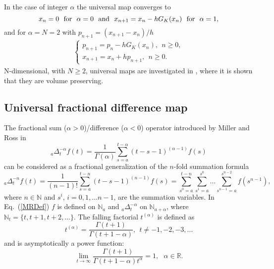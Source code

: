\documentclass[graybox]{svmult}
\begin{document}
In the case of integer $\alpha$ the universal map converges to
\begin{equation}
x_n=0  \  \ {\rm for} \  \ \alpha = 0 \  \ {\rm and} \  \ x_{n+1}=x_n-hG_K(x_n)  
\  \ {\rm for} \  \  \alpha = 1, 
\label{IntFr01} 
\end{equation}
and for $\alpha=N = 2$ with $p_{n+1}=(x_{n+1}-x_n)/h $
\begin{equation}
\begin{array}{c}
\left\{
\begin{array}{lll}
p_{n+1}=p_n-h G_K(x_{n}), \ \ n \ge 0,
\\ 
x_{n+1} = x_{n}+hp_{n+1}, \ \ n \ge 0.
\end{array}
\right.
\end{array} 
\label{IntFr2}
\end{equation} 
N-dimensional, with  $N \ge 2$, universal maps are investigated in \cite{ME4},
where it is shown that they are volume preserving.  


\subsection{Universal fractional difference map}
\label{SecUFDM}


The fractional 
sum ($\alpha>0$)/difference ($\alpha<0$) operator introduced by Miller and Ross in \cite{MR} 
\begin{equation}
_a\Delta^{-\alpha}_{t}f(t)=\frac{1}{\Gamma(\alpha)} \sum^{t-\alpha}_{s=a}(t-s-1)^{(\alpha-1)} f(s)
\label{MRDef}
\end{equation}
can be considered as a fractional generalization of the $n$-fold summation formula \cite{ME9,GZ}
\begin{equation} 
_a\Delta^{-n}_{t}f(t)=\frac{1}{(n-1)!} \sum^{t-n}_{s=a}(t-s-1)^{(n-1)}
f(s)
=\sum^{t-n}_{s^0=a} \sum^{s^0}_{s^1=a}...
\sum^{s^{n-2}}_{s^{n-1}=a}f(s^{n-1}),
\label{MRInt}
\end{equation}
where $n \in \mathbb{N}$ and $s^{i}$, $i=0,1,...n-1$, are the summation variables. In Eq.~(\ref{MRDef}) $f$ is defined on  $\mathbb{N}_a$ and $_a\Delta^{-\alpha}_t$ on  
$\mathbb{N}_{a+\alpha}$, where   $\mathbb{N}_t=\{t,t+1, t+2, ...\}$.
The falling factorial $t^{(\alpha)}$ is defined as
\begin{equation}
t^{(\alpha)} =\frac{\Gamma(t+1)}{\Gamma(t+1-\alpha)}, \ \ t\ne -1, -2, -3,
...
\label{FrFac}
\end{equation}
and is asymptotically a power function:
\begin{equation}
\lim_{t \rightarrow
  \infty}\frac{\Gamma(t+1)}{\Gamma(t+1-\alpha)t^{\alpha}}=1,  
\ \ \ \alpha \in  \mathbb{R}.
\label{GammaLimit}
\end{equation}
\end{document}
